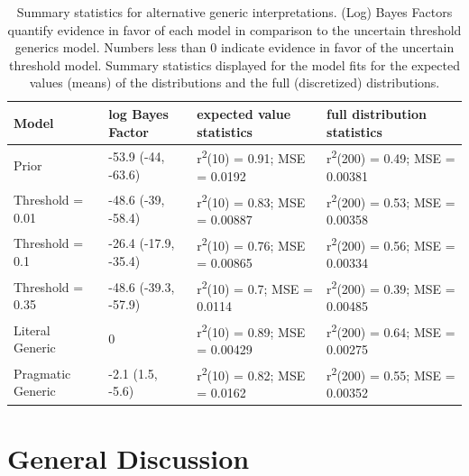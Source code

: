 \documentclass[floatsintext,doc]{apa6}
\newcommand{\red}[1]{{\textcolor{Red}{#1}}}
\begin{document}
\begin{table}[h]
\centering
\begingroup\fontsize{9pt}{10pt}\selectfont
\begin{tabular}{llll}
  \hline
Model & log Bayes Factor & expected value statistics & full distribution statistics \\ 
  \hline
Prior & -53.9 (-44, -63.6) & r\textsuperscript{2}(10) = 0.91; MSE = 0.0192 & r\textsuperscript{2}(200) = 0.49; MSE = 0.00381 \\ 
  Threshold = 0.01 & -48.6 (-39, -58.4) & r\textsuperscript{2}(10) = 0.83; MSE = 0.00887 & r\textsuperscript{2}(200) = 0.53; MSE = 0.00358 \\ 
  Threshold = 0.1 & -26.4 (-17.9, -35.4) & r\textsuperscript{2}(10) = 0.76; MSE = 0.00865 & r\textsuperscript{2}(200) = 0.56; MSE = 0.00334 \\ 
  Threshold = 0.35 & -48.6 (-39.3, -57.9) & r\textsuperscript{2}(10) = 0.7; MSE = 0.0114 & r\textsuperscript{2}(200) = 0.39; MSE = 0.00485 \\ 
  Literal Generic & 0 & r\textsuperscript{2}(10) = 0.89; MSE = 0.00429 & r\textsuperscript{2}(200) = 0.64; MSE = 0.00275 \\ 
  Pragmatic Generic & -2.1 (1.5, -5.6) & r\textsuperscript{2}(10) = 0.82; MSE = 0.0162 & r\textsuperscript{2}(200) = 0.55; MSE = 0.00352 \\ 
   \hline
\end{tabular}
\endgroup
\caption{Summary statistics for alternative generic interpretations. (Log) Bayes Factors quantify evidence in favor of each model in comparison to the uncertain threshold generics model. Numbers less than 0 indicate evidence in favor of the uncertain threshold model. Summary statistics displayed for the model fits for the expected values (means) of the distributions and the full (discretized) distributions.} 
\end{table}

\hypertarget{general-discussion}{%
\section{General Discussion}\label{general-discussion}}


\end{document}
